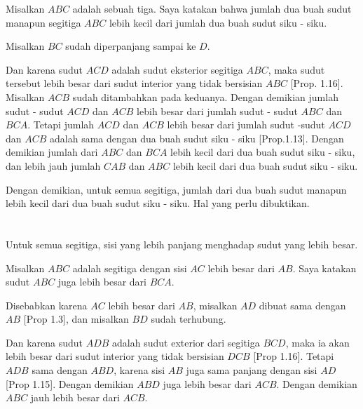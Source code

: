 \documentclass[a4paper]{book}
\begin{document}
Misalkan $ABC$ adalah sebuah tiga. Saya katakan bahwa jumlah  dua buah 
sudut manapun segitiga $ABC$ lebih kecil dari jumlah dua buah sudut siku - siku.

Misalkan $BC$ sudah diperpanjang sampai ke $D$.

Dan karena sudut $ACD$ adalah sudut eksterior segitiga $ABC$, maka sudut 
tersebut lebih besar dari sudut interior yang tidak bersisian 
$ABC$ [Prop. 1.16]. 
Misalkan $ACB$ sudah ditambahkan pada keduanya. Dengan demikian jumlah 
sudut - sudut $ACD$ dan $ACB$ lebih besar dari jumlah sudut - sudut $ABC$ dan 
$BCA$. Tetapi jumlah $ACD$ dan $ACB$  lebih besar dari jumlah sudut -sudut
$ACD$ dan $ACB$ adalah sama dengan dua buah sudut siku - siku [Prop.1.13].
Dengan demikian jumlah dari $ABC$ dan $BCA$ lebih kecil dari dua buah sudut 
siku - siku, dan lebih jauh jumlah $CAB$ dan $ABC$ lebih kecil dari dua
buah sudut siku - siku.

Dengan demikian, untuk semua segitiga, jumlah dari dua buah sudut manapun
lebih kecil dari dua buah sudut siku - siku. Hal yang perlu dibuktikan.


\section*{\centering \thesection} 
Untuk semua segitiga, sisi yang lebih panjang menghadap sudut yang lebih
besar.

\begin{center}
\end{center}

Misalkan $ABC$ adalah segitiga dengan sisi $AC$ lebih besar dari $AB$. Saya
katakan sudut $ABC$ juga lebih besar dari $BCA$.

Disebabkan karena $AC$ lebih besar dari $AB$, misalkan $AD$ dibuat sama
dengan $AB$ [Prop 1.3], dan misalkan $BD$ sudah terhubung.

Dan karena sudut $ADB$ adalah sudut exterior dari segitiga $BCD$, maka ia
akan lebih besar dari sudut interior yang tidak bersisian $DCB$ [Prop 1.16].
Tetapi $ADB$ sama dengan $ABD$, karena sisi $AB$ juga sama panjang dengan 
sisi $AD$ [Prop 1.15]. Dengan demikian $ABD$ juga lebih besar dari $ACB$.
Dengan demikian $ABC$ jauh lebih besar dari $ACB$.
\end{document}
